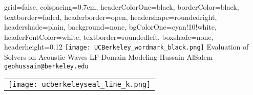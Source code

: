 \documentclass[landscape,a0paper,fontscale=0.292]{baposter}
\begin{document}
\begin{poster}{
 grid=false,
 colspacing=0.7em,
 headerColorOne=black,
 borderColor=black,
 textborder=faded,
 headerborder=open,
 headershape=roundedright,
 headershade=plain,
 background=none,
 bgColorOne=cyan!10!white,
 headerFontColor=white,
 textborder=roundedleft,
 boxshade=none,
 headerheight=0.12\textheight}
 {
      \texttt{[image: UCBerkeley\_wordmark\_black.png]}
 }
 {\sc\huge Evaluation of Solvers on Acoustic Waves LF-Domain Modeling}
 {Hussain AlSalem\\[1em]
 {\texttt{geohussain@berkeley.edu}}}
 {
  \begin{tabular}{r}
    \texttt{[image: ucberkeleyseal\_line\_k.png]}
  \end{tabular}
 }



\end{poster}
\end{document}
